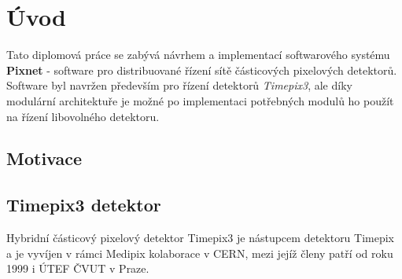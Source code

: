 

\chapter{Úvod}\label{chap01} 
Tato diplomová práce se zabývá návrhem a implementací softwarového systému \textbf{Pixnet} - software pro distribuované řízení sítě částicových pixelových detektorů. Software byl navržen především pro řízení detektorů \textit{Timepix3}, ale díky modulární architektuře je možné po implementaci potřebných modulů ho použít na řízení libovolného detektoru.

\section{Motivace}
\todo

\section{Timepix3 detektor}
Hybridní částicový pixelový detektor Timepix3\cite{timepix3} je nástupcem detektoru Timepix\cite{timepix} a je vyvíjen v rámci Medipix kolaborace v CERN, mezi jejíž členy patří od roku 1999 i ÚTEF ČVUT v Praze.

